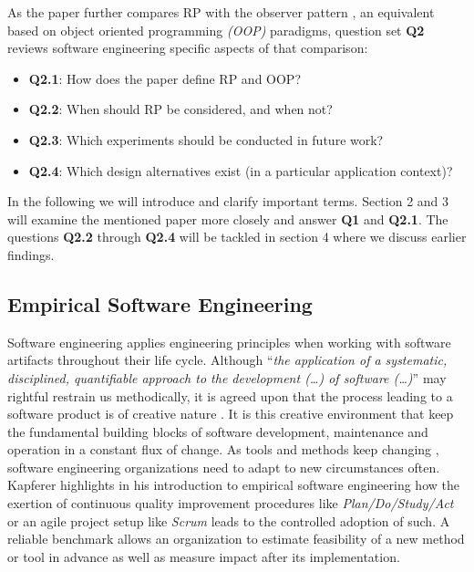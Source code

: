\documentclass[12pt,a4paper]{article}
\begin{document}
As the paper further compares RP with the observer pattern \cite{gamma1995design}, an equivalent based on object oriented programming \emph{(OOP)} paradigms, question set \textbf{Q2} reviews software engineering specific aspects of that comparison:

\begin{itemize}
	\item \textbf{Q2.1}: How does the paper define RP and OOP?
	\item \textbf{Q2.2}: When should RP be considered, and when not?
	\item \textbf{Q2.3}: Which experiments should be conducted in future work?
	\item \textbf{Q2.4}: Which design alternatives exist (in a particular application context)?
\end{itemize}

In the following we will introduce and clarify important terms. Section 2 and 3 will examine the mentioned paper more closely and answer \textbf{Q1} and \textbf{Q2.1}. The questions \textbf{Q2.2} through \textbf{Q2.4} will be tackled in section 4 where we discuss earlier findings.

\subsection{Empirical Software Engineering}
Software engineering applies engineering principles when working with software artifacts \cite{159342} throughout their life cycle. Although ``\emph{the application of a systematic, disciplined, quantifiable approach to the development (\dots) of software (\dots)}'' \cite{159342} may rightful restrain us methodically, it is agreed upon that the process leading to a software product is of creative nature \cite{8051350}. It is this creative environment that keep the fundamental building blocks of software development, maintenance and operation in a constant flux of change. As tools and methods keep changing \cite{kapferer:2019:empirical}, software engineering organizations need to adapt to new circumstances often. Kapferer \cite{kapferer:2019:empirical} highlights in his introduction to empirical software engineering how the exertion of continuous quality improvement procedures like \emph{Plan/Do/Study/Act} \cite{deming} or an agile project setup like \emph{Scrum} leads to the controlled adoption of such. A reliable benchmark allows an organization to estimate feasibility of a new method or tool in advance as well as measure impact after its implementation.
\end{document}
